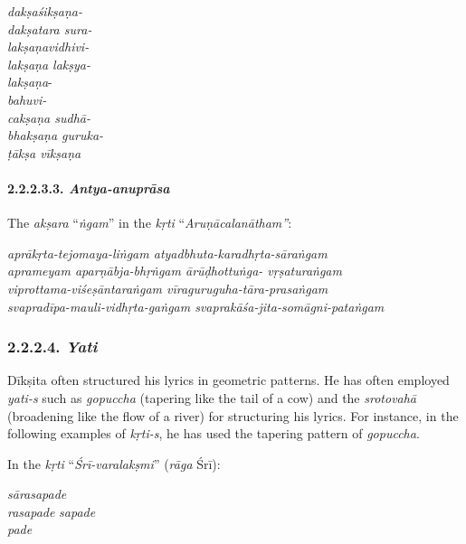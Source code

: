 \begin{myquote}
\textit{dakṣaśikṣaṇa-}\\\textit{dakṣatara sura-}\\\textit{lakṣaṇavidhivi-}\\\textit{lakṣaṇa lakṣya-}\\\textit{lakṣaṇa}-\\\textit{bahuvi-}\\\textit{cakṣaṇa sudhā-}\\\textit{bhakṣaṇa guruka-}\\\textit{ṭākṣa vīkṣaṇa}
\end{myquote}


\paragraph*{2.2.2.3.3. \textit{Antya-anuprāsa}}

The \textit{akṣara} “\textit{ṅgam}” in the \textit{kṛti} “\textit{Aruṇācalanātham”}:

\begin{myquote}
\textit{aprākṛta-tejomaya-liṅgam atyadbhuta-karadhṛta-sāraṅgam}\\\textit{aprameyam aparṇābja-bhṛṅgam ārūḍhottuṅga- vṛṣaturaṅgam}\\\textit{viprottama-viśeṣāntaraṅgam vīraguruguha-tāra-prasaṅgam}\\\textit{svapradīpa-mauli-vidhṛta-gaṅgam svaprakāśa-jita-somāgni-pataṅgam}
\end{myquote}



\subsubsection*{2.2.2.4. \textit{Yati}}

Dīkṣita often structured his lyrics in geometric patterns. He has often employed \textit{yati-s} such as \textit{gopuccha} (tapering like the tail of a cow) and the \textit{srotovahā} (broadening like the flow of a river) for structuring his lyrics. For instance, in the following examples of \textit{kṛti-s}, he has used the tapering pattern of \textit{gopuccha}.

In the \textit{kṛti} “\textit{Śrī-varalakṣmi}” (\textit{rāga} Śrī):

\begin{myquote}
\textit{sārasapade}\\\textit{rasapade} \textit{sapade}\\\textit{pade}
\end{myquote}

